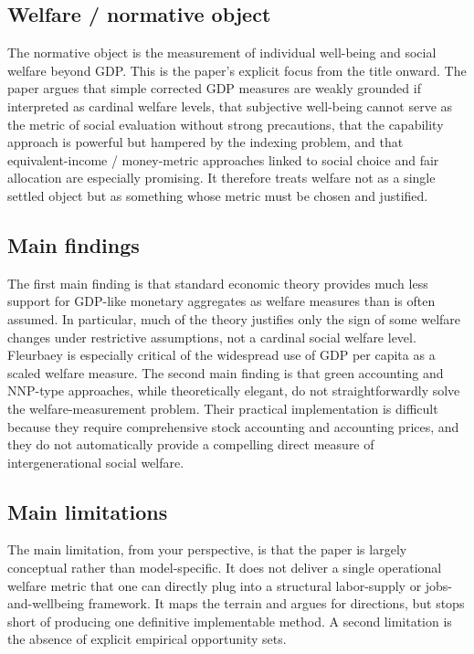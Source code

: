 \documentclass[11pt,a4paper]{article}
\begin{document}
\subsection*{Welfare / normative object}
The normative object is the measurement of individual well-being and social welfare beyond GDP. This is the paper’s explicit focus from the title onward. The paper argues that simple corrected GDP measures are weakly grounded if interpreted as cardinal welfare levels, that subjective well-being cannot serve as the metric of social evaluation without strong precautions, that the capability approach is powerful but hampered by the indexing problem, and that equivalent-income / money-metric approaches linked to social choice and fair allocation are especially promising. It therefore treats welfare not as a single settled object but as something whose metric must be chosen and justified.

\subsection*{Main findings}
The first main finding is that standard economic theory provides much less support for GDP-like monetary aggregates as welfare measures than is often assumed. In particular, much of the theory justifies only the sign of some welfare changes under restrictive assumptions, not a cardinal social welfare level. Fleurbaey is especially critical of the widespread use of GDP per capita as a scaled welfare measure. The second main finding is that green accounting and NNP-type approaches, while theoretically elegant, do not straightforwardly solve the welfare-measurement problem. Their practical implementation is difficult because they require comprehensive stock accounting and accounting prices, and they do not automatically provide a compelling direct measure of intergenerational social welfare.

\subsection*{Main limitations}
The main limitation, from your perspective, is that the paper is largely conceptual rather than model-specific. It does not deliver a single operational welfare metric that one can directly plug into a structural labor-supply or jobs-and-wellbeing framework. It maps the terrain and argues for directions, but stops short of producing one definitive implementable method. A second limitation is the absence of explicit empirical opportunity sets.
\end{document}
